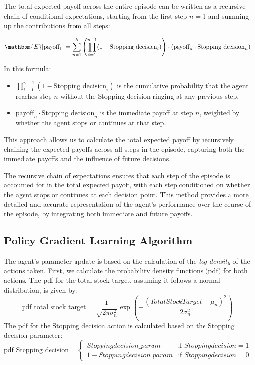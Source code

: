 \documentclass[a4paper, 12pt]{article}
\begin{document}
The total expected payoff across the entire episode can be written as a recursive chain of conditional expectations, starting from the first step \( n = 1 \) and summing up the contributions from all steps:

\[
\mathbbm{E}[\text{payoff}_1] = \sum_{n=1}^{N} \left( \prod_{i=1}^{n-1} (1 - \text{Stopping decision}_i) \right) \cdot \left( \text{payoff}_n \cdot \text{Stopping decision}_n \right)
\]

In this formula:
\begin{itemize}
    \item \( \prod_{i=1}^{n-1} (1 - \text{Stopping decision}_i) \) is the cumulative probability that the agent reaches step \( n \) without the Stopping decision ringing at any previous step,
    \item \( \text{payoff}_n \cdot \text{Stopping decision}_n \) is the immediate payoff at step \( n \), weighted by whether the agent stops or continues at that step.
\end{itemize}

This approach allows us to calculate the total expected payoff by recursively chaining the expected payoffs across all steps in the episode, capturing both the immediate payoffs and the influence of future decisions.

The recursive chain of expectations ensures that each step of the episode is accounted for in the total expected payoff, with each step conditioned on whether the agent stops or continues at each decision point. This method provides a more detailed and accurate representation of the agent's performance over the course of the episode, by integrating both immediate and future payoffs.


\subsection{Policy Gradient Learning Algorithm}

The agent's parameter update is based on the calculation of the \textit{log-density} of the actions taken. First, we calculate the probability density functions (pdf) for both actions. The pdf for the total stock target, assuming it follows a normal distribution, is given by:
\[
\text{pdf\_total\_stock\_target} = \frac{1}{\sqrt{2\pi\sigma_n^2}} \exp\left(-\frac{(TotalStockTarget - \mu_n)^2}{2\sigma_n^2}\right)
\]
The pdf for the Stopping decision action is calculated based on the Stopping decision parameter:
\[
\text{pdf\_Stopping decision} = \begin{cases} 
Stopping decision\_param & \text{if } Stopping decision = 1 \\ 
1 - Stopping decision\_param & \text{if } Stopping decision = 0 
\end{cases}
\]
\end{document}
